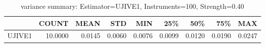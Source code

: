 \begin{table}[ht]
\centering
\caption{variance summary: Estimator=UJIVE1, Instruments=100, Strength=0.40}
\begin{tabular}{lrrrrrrrr}
\toprule
 & COUNT & MEAN & STD & MIN & 25\% & 50\% & 75\% & MAX \\
\midrule
UJIVE1 & 10.0000 & 0.0145 & 0.0060 & 0.0076 & 0.0099 & 0.0120 & 0.0190 & 0.0247 \\
\bottomrule
\end{tabular}
\end{table}
